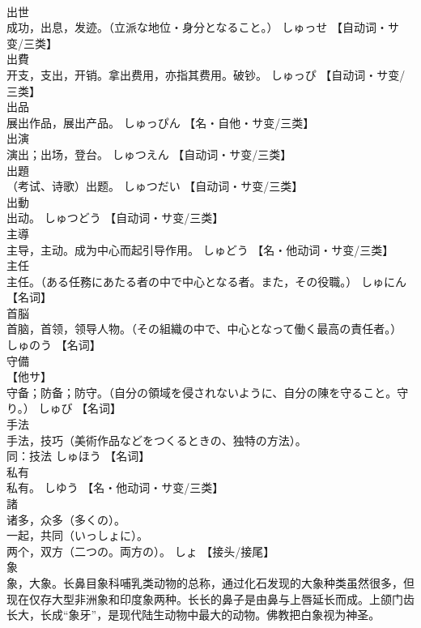 \documentclass[8pt]{extreport}
\begin{document}
\begin{CJK}{UTF8}{min}
\\	出世	
\\	成功，出息，发迹。（立派な地位・身分となること。）	しゅっせ		【自动词・サ变/三类】
\\	出費	
\\	开支，支出，开销。拿出费用，亦指其费用。破钞。	しゅっぴ		【自动词・サ变/三类】
\\	出品	
\\	展出作品，展出产品。	しゅっぴん		【名・自他・サ变/三类】
\\	出演	
\\	演出；出场，登台。	しゅつえん		【自动词・サ变/三类】
\\	出題	
\\	（考试、诗歌）出题。	しゅつだい		【自动词・サ变/三类】
\\	出動	
\\	出动。	しゅつどう		【自动词・サ变/三类】
\\	主導	
\\	主导，主动。成为中心而起引导作用。	しゅどう		【名・他动词・サ变/三类】
\\	主任	
\\	主任。（ある任務にあたる者の中で中心となる者。また，その役職。）	しゅにん		【名词】
\\	首脳	
\\	首脑，首领，领导人物。（その組織の中で、中心となって働く最高の責任者。）	しゅのう		【名词】
\\	守備	
\\	【他サ】 
\\	守备；防备；防守。（自分の領域を侵されないように、自分の陳を守ること。守り。）	しゅび		【名词】
\\	手法	
\\	手法，技巧（美術作品などをつくるときの、独特の方法）。 
\\	同：技法	しゅほう		【名词】
\\	私有	
\\	私有。	しゆう		【名・他动词・サ变/三类】
\\	諸	
\\	诸多，众多（多くの）。 
\\	一起，共同（いっしょに）。 
\\	两个，双方（二つの。両方の）。	しょ		【接头/接尾】
\\	象	
\\	象，大象。长鼻目象科哺乳类动物的总称，通过化石发现的大象种类虽然很多，但现在仅存大型非洲象和印度象两种。长长的鼻子是由鼻与上唇延长而成。上颌门齿长大，长成“象牙”，是现代陆生动物中最大的动物。佛教把白象视为神圣。 

\end{CJK}
\end{document}
